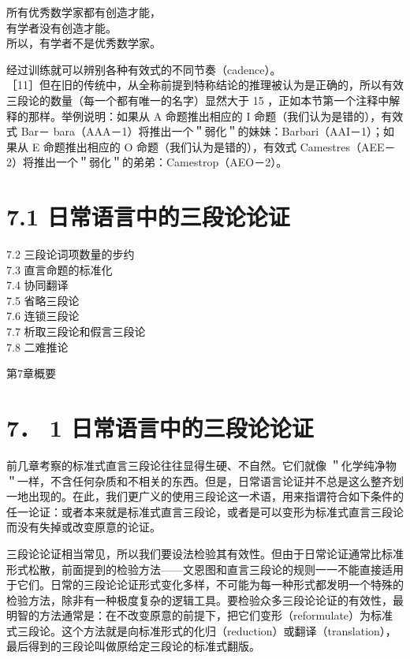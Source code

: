 \begin{displayquote}
所有优秀数学家都有创造才能，\\
有学者没有创造才能。\\
所以，有学者不是优秀数学家。
\end{displayquote}

经过训练就可以辨别各种有效式的不同节奏（cadence）。\\
［11］但在旧的传统中，从全称前提到特称结论的推理被认为是正确的，所以有效三段论的数量（每一个都有唯一的名字）显然大于 15 ，正如本节第一个注释中解释的那样。举例说明：如果从 A 命题推出相应的 I 命题（我们认为是错的），有效式 Bar－ bara（AAA－1）将推出一个＂弱化＂的妹妹：Barbari（AAI－1）；如果从 E 命题推出相应的 O 命题（我们认为是错的），有效式 Camestres（AEE－2）将推出一个＂弱化＂的弟弟：Camestrop（AEO－2）。

\section*{7.1 日常语言中的三段论论证}
7.2 三段论词项数量的步约\\
7.3 直言命题的标准化\\
7.4 协同翻译\\
7.5 省略三段论\\
7.6 连锁三段论\\
7.7 析取三段论和假言三段论\\
7.8 二难推论

第7章概要

\section*{7． 1 日常语言中的三段论论证}
前几章考察的标准式直言三段论往往显得生硬、不自然。它们就像 ＂化学纯净物＂一样，不含任何杂质和不相关的东西。但是，日常语言论证并不总是这么整齐划一地出现的。在此，我们更广义的使用三段论这一术语，用来指谓符合如下条件的任一论证：或者本来就是标准式直言三段论，或者是可以变形为标准式直言三段论而没有失掉或改变原意的论证。

三段论论证相当常见，所以我们要设法检验其有效性。但由于日常论证通常比标准形式松散，前面提到的检验方法——文恩图和直言三段论的规则一一不能直接适用于它们。日常的三段论论证形式变化多样，不可能为每一种形式都发明一个特殊的检验方法，除非有一种极度复杂的逻辑工具。要检验众多三段论论证的有效性，最明智的方法通常是：在不改变原意的前提下，把它们变形（reformulate）为标准式三段论。这个方法就是向标准形式的化归（reduction）或翻译（translation），最后得到的三段论叫做原给定三段论的标准式翻版。

